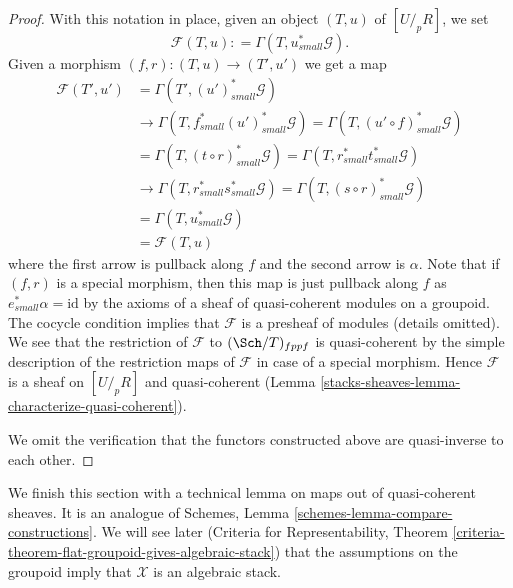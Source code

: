 \begin{proof}
\medskip\noindent
With this notation in place, given an object $(T, u)$ of $[U/_{\!p}R]$, we set
$$
\mathcal{F}(T, u) : = \Gamma(T, u_{small}^*\mathcal{G}).
$$
Given a morphism $(f, r) : (T, u) \to (T', u')$ we get a map
\begin{align*}
\mathcal{F}(T', u') & = \Gamma(T', (u')_{small}^*\mathcal{G}) \\
& \to \Gamma(T, f_{small}^*(u')_{small}^*\mathcal{G}) =
\Gamma(T, (u' \circ f)_{small}^*\mathcal{G}) \\
& = \Gamma(T, (t \circ r)_{small}^*\mathcal{G}) =
\Gamma(T, r_{small}^*t_{small}^*\mathcal{G}) \\
& \to \Gamma(T, r_{small}^*s_{small}^*\mathcal{G}) =
\Gamma(T, (s \circ r)_{small}^*\mathcal{G}) \\
& = \Gamma(T, u_{small}^*\mathcal{G}) \\
& = \mathcal{F}(T, u)
\end{align*}
where the first arrow is pullback along $f$ and the second arrow is
$\alpha$. Note that if $(f, r)$ is a special morphism, then this
map is just pullback along $f$ as $e_{small}^*\alpha = \text{id}$ by
the axioms of a sheaf of quasi-coherent modules on a groupoid.
The cocycle condition implies that $\mathcal{F}$ is a presheaf
of modules (details omitted). We see that the restriction of $\mathcal{F}$
to $(\Sch/T)_{fppf}$ is quasi-coherent by the simple description of the
restriction maps of $\mathcal{F}$ in case of a special morphism.
Hence $\mathcal{F}$ is a sheaf on $[U/_{\!p}R]$ and quasi-coherent
(Lemma \ref{stacks-sheaves-lemma-characterize-quasi-coherent}).

\medskip\noindent
We omit the verification that the functors constructed above are
quasi-inverse to each other.
\end{proof}

We finish this section with a technical lemma on maps out of quasi-coherent
sheaves. It is an analogue of
Schemes, Lemma \ref{schemes-lemma-compare-constructions}.
We will see later (Criteria for Representability, Theorem
\ref{criteria-theorem-flat-groupoid-gives-algebraic-stack})
that the assumptions on the groupoid imply that $\mathcal{X}$ is
an algebraic stack.

